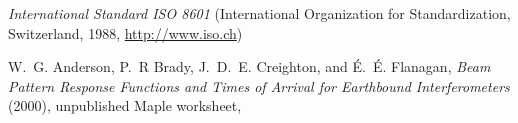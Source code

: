 \begin{thebibliography}{1}
  \textit{International Standard ISO 8601} (International Organization for
  Standardization, Switzerland, 1988, \url{http://www.iso.ch})
  
 W.~G. Anderson, P.~R Brady, J.~D.~E. Creighton,
  and \'E.~\'E. Flanagan, \emph{Beam Pattern Response Functions and
  Times of Arrival for Earthbound Interferometers} (2000), unpublished
  Maple worksheet,
  
\end{thebibliography}

